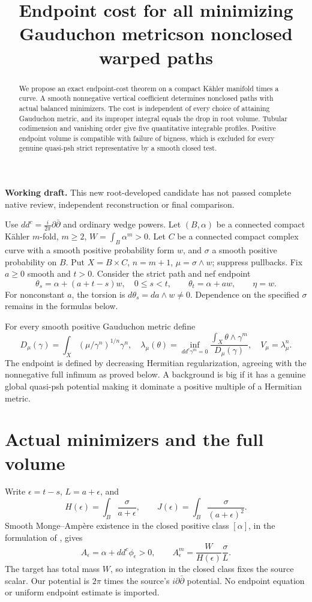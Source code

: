 \documentclass[11pt]{article}
\title{Endpoint cost for all minimizing Gauduchon metrics\newline on nonclosed warped paths}
\author{}\date{}
\newcommand{\ddc}{dd^c}
\theoremstyle{remark}\newtheorem{remark}[theorem]{Remark}
\begin{document}
\maketitle
\noindent\textbf{Working draft.} This new root-developed candidate has not
passed complete native review, independent reconstruction or final comparison.
\begin{abstract}
We propose an exact endpoint-cost theorem on a compact K\"ahler manifold
times a curve. A smooth nonnegative vertical coefficient determines
nonclosed paths with actual balanced minimizers. The cost is independent
of every choice of attaining Gauduchon metric, and its improper integral
equals the drop in root volume. Tubular codimension and vanishing order
give five quantitative integrable profiles. Positive endpoint volume is
compatible with failure of bigness, which is excluded for every genuine
quasi-psh strict representative by a smooth closed test.
\end{abstract}

Use $\ddc=\frac{i}{2\pi}\partial\bar\partial$ and ordinary wedge powers.
Let $(B,\alpha)$ be a connected compact K\"ahler $m$-fold, $m\geq2$,
$W=\int_B\alpha^m>0$. Let $C$ be a connected compact complex curve
with a smooth positive probability form $w$, and $\sigma$ a smooth
positive probability on $B$. Put $X=B\times C$, $n=m+1$,
$\mu=\sigma\wedge w$; suppress pullbacks. Fix $a\geq0$ smooth and $t>0$.
Consider the strict path and nef endpoint
\[
 \theta_s=\alpha+(a+t-s)w,\quad 0\leq s<t,
 \qquad\theta_t=\alpha+aw,\qquad\eta=w.
\]
For nonconstant $a$, the torsion is $d\theta_s=da\wedge w\ne0$.
Dependence on the specified $\sigma$ remains in the formulas below.

For every smooth positive Gauduchon metric define
\[
 D_\mu(\gamma)=\int_X(\mu/\gamma^n)^{1/n}\gamma^n,
 \quad\lambda_\mu(\theta)=
 \inf_{\ddc\gamma^m=0}\frac{\int_X\theta\wedge\gamma^m}{D_\mu(\gamma)},
 \quad V_\mu=\lambda_\mu^n.
\]
The endpoint is defined by decreasing Hermitian regularization, agreeing
with the nonnegative full infimum as proved below. A background is big
if it has a genuine global quasi-psh potential making it dominate a
positive multiple of a Hermitian metric.

\section{Actual minimizers and the full volume}
Write $\epsilon=t-s$, $L=a+\epsilon$, and
\[
 H(\epsilon)=\int_B\frac{\sigma}{a+\epsilon},\qquad
 J(\epsilon)=\int_B\frac{\sigma}{(a+\epsilon)^2}.
\]
Smooth Monge--Amp\`ere existence in the closed positive class
$[\alpha]$, in the formulation of \cite[Corollary 1]{TW}, gives
\[
 A_\epsilon=\alpha+\ddc\phi_\epsilon>0,\qquad
 A_\epsilon^m=\frac{W}{H(\epsilon)}\frac{\sigma}{L}.
\]
The target has total mass $W$, so integration in the closed class fixes
the source scalar. Our potential is $2\pi$ times the source's
$i\partial\bar\partial$ potential. No endpoint equation or uniform
endpoint estimate is imported.
\end{document}

